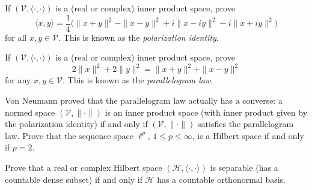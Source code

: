 \documentclass[12pt,letterpaper,cm]{hmcpset}
\begin{document}
\begin{problem}[1]
    If $(\mathcal{V},\langle\cdot,\cdot\rangle)$ is a (real or complex) inner product space, prove
    \[
        \langle x,y \rangle = \frac{1}{4}\bigl(\|x+y\|^2 - \|x-y\|^2 + i\|x-iy\|^2 - i\|x+iy\|^2\bigr)
    \]
    for all $x,y\in\mathcal{V}$. This is known as the \emph{polarization identity}.
\end{problem}

\begin{solution}
    \vfill
\end{solution}

\begin{problem}[2]
    If $(\mathcal{V},\langle\cdot,\cdot\rangle)$ is a (real or complex) inner product space, prove
    \[
        2\|x\|^2 + 2\|y\|^2 = \|x+y\|^2 + \|x-y\|^2
    \]
    for any $x,y\in\mathcal{V}$. This is known as the \emph{parallelogram law}.
\end{problem}

\begin{solution}
    \vfill
\end{solution}

\begin{problem}[3]
    Von Neumann proved that the parallelogram law actually has a converse: a normed
    space $(\mathcal{V},\|\cdot\|)$ is an inner product space (with inner product given
    by the polarization identity) if and only if $(\mathcal{V},\|\cdot\|)$ satisfies the
    parallelogram law. Prove that the sequence space $\ell^p$, $1\leq p \leq \infty$,
    is a Hilbert space if and only if $p=2$.
\end{problem}

\begin{solution}
    \vfill
\end{solution}

\begin{problem}[4]
    Prove that a real or complex Hilbert space $(\mathcal{H},\langle \cdot,\cdot \rangle)$ is separable
    (has a countable dense subset) if and only if $\mathcal{H}$ has a countable
    orthonormal basis.
\end{problem}

\begin{solution}
    \vfill
\end{solution}
\end{document}
